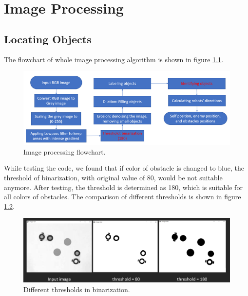 \chapter{Image Processing}
\label{cha:IP}

\section{Locating Objects}

The flowchart of whole image processing algorithm is shown in figure \ref{IP_flow}.

\begin{figure}[thb]
    \centering
    \includegraphics[width=1\textwidth]{images/Image processing flowchart.png}
    \caption[Image processing flowchart]{Image processing flowchart.}\label{IP_flow}
\end{figure}

While testing the code, we found that if color of obstacle is changed to blue, the threshold of binarization, with original value of 80, would be not suitable anymore. After testing, the threshold is determined as 180, which is suitable for all colors of obstacles. The comparison of different thresholds is shown in figure \ref{different_threshold}.

\begin{figure}[thb]
    \centering
    \includegraphics[width=1\textwidth]{images/different_threshold.png}
    \caption[Different thresholds in binarization]{Different thresholds in binarization.}\label{different_threshold}
\end{figure}

